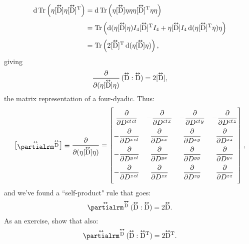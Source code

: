 \documentclass[12pt]{article}
\newcommand{\dd}[1]{\mathrm{d}#1}
\newcommand{\superoverset}[2]{%
  \mathop{#2}\limits^{\vbox to -.5ex{\kern-0.95ex\hbox{$#1$}\vss}}}
\newcommand{\superdy}[1]{\superoverset{\text{\tiny$\bm\leftrightarrow$}}{#1}}
\newcommand{\capdy}[1]{ \overset{ \text{\tiny$\bm\leftrightarrow$} }{\vphantom{\text{\small{A}}}\smash{#1}} }
\begin{document}
\begin{equation*}
\begin{aligned}
\dd \, \mathrm{Tr} \left( \eta [\capdy{\mathrm{D}}] \eta [ \capdy{\mathrm{D}} ]^{\mathrm{T}} \right) &= \dd \, \mathrm{Tr} \left( \eta [\capdy{\mathrm{D}}] \eta \eta \eta [ \capdy{\mathrm{D}} ]^{\mathrm{T}} \eta \eta \right) \\[3pt]
&= \mathrm{Tr} \left( \dd (\eta [\capdy{\mathrm{D}}] \eta ) I_4 [ \capdy{\mathrm{D}} ]^{\mathrm{T}} I_4 +  \eta [\capdy{\mathrm{D}}] I_4 \, \dd ( \eta [\capdy{\mathrm{D}}]^\mathrm{T} \eta ) \eta \right) \\[3pt]
&= \mathrm{Tr} \left( 2 [\capdy{\mathrm{D}}]^\mathrm{T} \, \dd (\eta [\capdy{\mathrm{D}}] \eta ) \right) ,
\end{aligned}
\end{equation*}
giving
\begin{equation*}
\dfrac{\partial}{\partial (\eta [ \capdy{\mathrm{D}} ] \eta)} \, ( \capdy{\mathrm{D}} : \capdy{\mathrm{D}} ) = 2 [\capdy{\mathrm{D}}],
\end{equation*}
the matrix representation of a four-dyadic. Thus:
\begin{equation*}
\begin{bmatrix}
\capdy{\partialrm} {}^{\superdy{\mathrm{D}}} \\[-.375ex]
\end{bmatrix}
\equiv
\dfrac{\partial}{\partial (\eta [ \capdy{\mathrm{D}} ] \eta)}
=
\begin{bmatrix}
\\[-2ex]
\dfrac{\partial}{\partial D^{ct \mkern1.5mu ct}} & -\dfrac{\partial}{\partial D^{ct \mkern1.5mu x}} & -\dfrac{\partial}{\partial D^{ct \mkern1.5mu y}} & -\dfrac{\partial}{\partial D^{ct \mkern1.5mu z}} \\[2ex]
-\dfrac{\partial}{\partial D^{x \mkern1.5mu ct}} & \dfrac{\partial}{\partial D^{x x}} & \dfrac{\partial}{\partial D^{x y}} & \dfrac{\partial}{\partial D^{x z}}  \\[2ex]
-\dfrac{\partial}{\partial D^{y \mkern1.5mu ct}} & \dfrac{\partial}{\partial D^{y x}} & \dfrac{\partial}{\partial D^{y y}} & \dfrac{\partial}{\partial D^{y z}}  \\[2ex]
-\dfrac{\partial}{\partial D^{z \mkern1.5mu ct}} & \dfrac{\partial}{\partial D^{z x}} & \dfrac{\partial}{\partial D^{z y}} & \dfrac{\partial}{\partial D^{z z}} \\[2ex]
\end{bmatrix} ,
\end{equation*}
and we've found a ``self-product" rule that goes:
\begin{equation}\label{eq:dyoprule1}
\capdy{\partialrm} {}^{\superdy{\mathrm{D}}} \, ( \capdy{\mathrm{D}} : \capdy{\mathrm{D}} ) = 2 \capdy{\mathrm{D}}.
\end{equation}
As an exercise, show that also:
 \begin{equation}\label{eq:dyoprule2}
\capdy{\partialrm} {}^{\superdy{\mathrm{D}}} \, ( \capdy{\mathrm{D}} : \capdy{\mathrm{D}} {}^\mathrm{T} ) = 2 \capdy{\mathrm{D}} {}^\mathrm{T}.
\end{equation}
\end{document}
